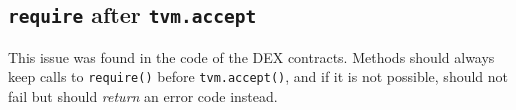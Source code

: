\subsection{{\tt require} after {\tt tvm.accept}}
\label{accept:require}


This issue was found in the code of the DEX contracts. Methods should
always keep calls to {\tt require()} before {\tt tvm.accept()}, and if
it is not possible, should not fail but should {\em return} an error
code instead.

